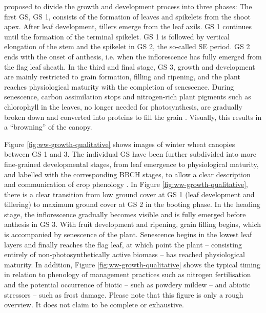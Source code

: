 \cite{kirby_analysis_1988} proposed to divide the growth and development process into three phases: The first \gls{GS}, \gls{GS} 1, consists of the formation of leaves and spikelets from the shoot apex. After leaf development, tillers emerge from the leaf axils. \gls{GS} 1 continues until the formation of the terminal spikelet. \gls{GS} 1 is followed by vertical elongation of the stem and the spikelet in \gls{GS} 2, the so-called \gls{SE} period. \gls{GS} 2 ends with the onset of anthesis, i.e. when the inflorescence has fully emerged from the flag leaf sheath. In the third and final stage, \gls{GS} 3, growth and development are mainly restricted to grain formation, filling and ripening, and the plant reaches physiological maturity with the completion of senescence. During senescence, carbon assimilation stops and nitrogen-rich plant pigments such as chlorophyll in the leaves, no longer needed for photosynthesis, are gradually broken down and converted into proteins to fill the grain \citep{thomas_stay-green_2014}. Visually, this results in a ``browning'' of the canopy.

Figure \ref{fig:ww-growth-qualitative} shows images of winter wheat canopies between \gls{GS} 1 and 3. The individual \gls{GS} have been further subdivided into more fine-grained developmental stages, from leaf emergence to physiological maturity, and labelled with the corresponding \gls{BBCH} stages, to allow a clear description and communication of crop phenology \citep{lancashire_uniform_1991}. In Figure \ref{fig:ww-growth-qualitative}, there is a clear transition from low ground cover at \gls{GS} 1 (leaf development and tillering) to maximum ground cover at \gls{GS} 2 in the booting phase. In the heading stage, the inflorescence gradually becomes visible and is fully emerged before anthesis in \gls{GS} 3. With fruit development and ripening, grain filling begins, which is accompanied by senescence of the plant. Senescence begins in the lowest leaf layers and finally reaches the flag leaf, at which point the plant -- consisting entirely of non-photosynthetically active biomass -- has reached physiological maturity. In addition, Figure \ref{fig:ww-growth-qualitative} shows the typical timing in relation to phenology of management practices such as nitrogen fertilisation and the potential occurrence of biotic -- such as powdery mildew -- and abiotic stressors -- such as frost damage. Please note that this figure is only a rough overview. It does not claim to be complete or exhaustive.

